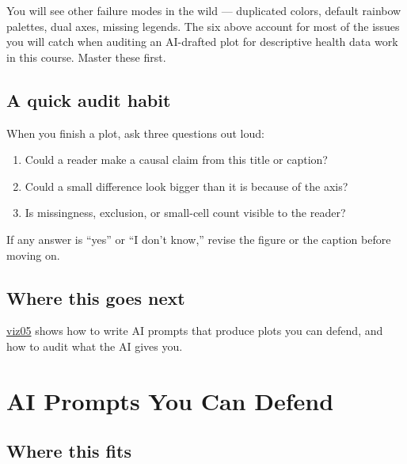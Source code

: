 \documentclass[
  letterpaper,
  DIV=11,
  numbers=noendperiod,
  oneside]{scrreprt}
\providecommand{\tightlist}{%
  \setlength{\itemsep}{0pt}\setlength{\parskip}{0pt}}
\begin{document}

You will see other failure modes in the wild --- duplicated colors,
default rainbow palettes, dual axes, missing legends. The six above
account for most of the issues you will catch when auditing an
AI-drafted plot for descriptive health data work in this course. Master
these first.

\section*{A quick audit habit}\label{a-quick-audit-habit}


When you finish a plot, ask three questions out loud:

\begin{enumerate}
\def\labelenumi{\arabic{enumi}.}
\tightlist
\item
  Could a reader make a causal claim from this title or caption?
\item
  Could a small difference look bigger than it is because of the axis?
\item
  Is missingness, exclusion, or small-cell count visible to the reader?
\end{enumerate}

If any answer is ``yes'' or ``I don't know,'' revise the figure or the
caption before moving on.

\section*{Where this goes next}\label{where-this-goes-next-3}


\href{viz05-ai-prompts-and-audit.qmd}{viz05} shows how to write AI
prompts that produce plots you can defend, and how to audit what the AI
gives you.

\chapter*{AI Prompts You Can Defend}\label{ai-prompts-you-can-defend}


\section*{Where this fits}\label{where-this-fits-3}
\end{document}
